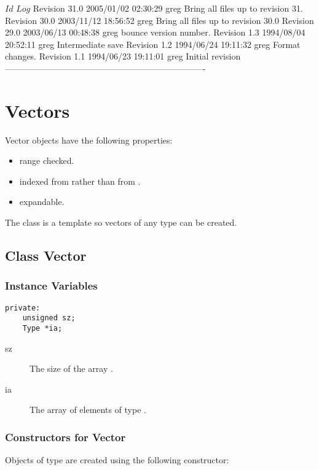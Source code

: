 \C 
\C $Id$
\C 
\C $Log$
\C Revision 31.0  2005/01/02 02:30:29  greg
\C Bring all files up to revision 31.
\C
\C Revision 30.0  2003/11/12 18:56:52  greg
\C Bring all files up to revision 30.0
\C
\C Revision 29.0  2003/06/13 00:48:38  greg
\C bounce version number.
\C
\C Revision 1.3  1994/08/04 20:52:11  greg
\C Intermediate save
\C
\C Revision 1.2  1994/06/24  19:11:32  greg
\C Format changes.
\C
\C Revision 1.1  1994/06/23  19:11:01  greg
\C Initial revision
\C
\C ----------------------------------------------------------------------
\section{Vectors}
\label{sec:vector}

Vector objects have the following properties:\begin{itemize}
\item range checked.
\item indexed from  rather than from . 
\item expandable.
\end{itemize}
The  class is a template so
vectors of any type can be created.  

\subsection{Class Vector}

\subsubsection{Instance Variables}

\begin{verbatim}
private:
    unsigned sz;
    Type *ia;
\end{verbatim}

\begin{description}
\item[sz] \texonly{---} The size of the array .
\item[ia] \texonly{---} The array of elements of type .
\end{description}
\subsubsection{Constructors for Vector}
\label{sec:vector-constructors}

Objects of type  are created using the following
constructor:


